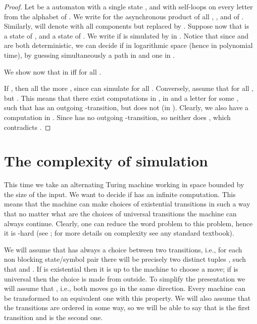 \documentclass{LMCS}
\theoremstyle{plain}\newtheorem{remark}{Remark}
\theoremstyle{plain}\newtheorem{lemma}[thm]{Lemma}
\begin{document}
\begin{proof}
  Let  be a automaton with a single state , and with
  self-loops on every letter from the alphabet  of . We
  write  for the asynchronous product of all , , and of . Similarly,  will denote 
with all components but  replaced by .  Suppose now that 
is a state of , and  a state of .  We write  if  is simulated by  in .
 Notice that since  and  are both deterministic,
we can decide if  in logarithmic space (hence in
polynomial time), by guessing simultaneously a path in  and one
in .

  We show now that  in  iff  for
  all .

  If , then all the more , since  can simulate  for all .
  Conversely, assume that 
  for all , but  . This means that
  there exist computations  in ,
   in  and a letter  for some , such that  has an outgoing
  -transition, but  does not (in ). Clearly, we
  also have a computation  in . Since  has no outgoing
  -transition, so neither does , which contradicts .
\end{proof}



\section{The complexity of simulation}

This time we take an alternating Turing machine  working in space
bounded by the size of the input. We want to decide if  has an
infinite computation.  This means that the machine can make choices of
existential transitions in such a way that no matter what are the
choices of universal transitions the machine can always
continue. Clearly, one can reduce the word problem to this problem,
hence it is \EXPTIME-hard (see \cite{cks81}; for more details on
complexity see any standard textbook).

We will assume that  has always a choice between two transitions,
i.e., for each non blocking state/symbol pair  there will be precisely two 
distinct tuples
,  such that  and . If  is existential then it is up to the machine to choose
a move; if  is universal then the choice is made from 
outside. To simplify the presentation we will assume that ,
i.e., both moves go in the same direction.  Every machine can be
transformed to an equivalent one with this property. We will also
assume that the transitions are ordered in some way, so we will be able
to say that  is the first transition and 
is the second one.
\end{document}
